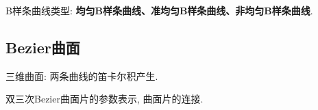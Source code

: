 \documentclass[12pt, a4paper, oneside]{ctexart}
\def\bf{\textbf}            %
\begin{document}
B样条曲线类型: \bf{均匀B样条曲线、准均匀B样条曲线、非均匀B样条曲线}.

\subsection{Bezier曲面}

三维曲面: 两条曲线的笛卡尔积产生.

双三次Bezier曲面片的参数表示, 曲面片的连接.

\end{document}
